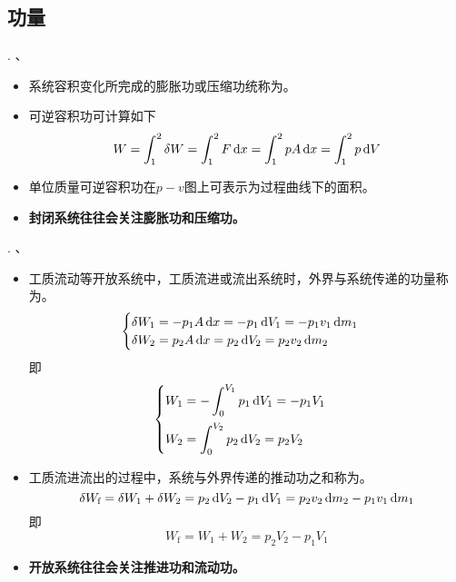 \subsection{功量}
. 、
	\begin{itemize}
		\item 系统容积变化所完成的膨胀功或压缩功统称为。
		\item 可逆容积功可计算如下
		\begin{equation}
			W= \int_{1}^{2} \delta W = \int_{1}^{2} F \, {\rm{d}} x = \int_{1}^{2} pA\,{\rm{d}} x =\int_{1}^{2} p\,{\rm{d}} V
		\end{equation}
	\item 单位质量可逆容积功在$p - v$图上可表示为过程曲线下的面积。
	\item \textbf{封闭系统往往会关注膨胀功和压缩功。}
	\end{itemize}
. 、
\begin{itemize}
	\item 工质流动等开放系统中，工质流进或流出系统时，外界与系统传递的功量称为。
	\begin{equation}
		\begin{cases}
			\delta W_1 = -p_1 A \,{\rm{d}} x = -p_1 \, {\rm{d}} V_1 = -p_1 v_1 \,{\rm{d}} m_1\\
			\delta W_2 = p_2 A \,{\rm{d}} x = p_2 \, {\rm{d}} V_2 = p_2 v_2 \,{\rm{d}} m_2
		\end{cases}
	\end{equation}
即
	\begin{equation}
		\begin{cases}
			\displaystyle W_1 = - \int_{0}^{V_1}p_1 \, {\rm{d}} V_1 = - p_1 V_1\\[1em]
			\displaystyle W_2 = \int_{0}^{V_2}p_2 \, {\rm{d}} V_2 = p_2 V_2\\
		\end{cases}
	\end{equation}
	\item 工质流进流出的过程中，系统与外界传递的推动功之和称为。
	\begin{equation}
		\delta W_{\text{f}}=\delta W_1+\delta W_2 =p_2 \,{\rm{d}} V_2 - p_1 \,{\rm{d}} V_1 = p_2 v_2 \,{\rm{d}} m_2 - p_1 v_1 \,{\rm{d}} m_1
	\end{equation}
	即
	\begin{equation}
		W_{\text{f}} = W_1 +W_2 = p_2V_2 -p_1V_1
	\end{equation}
	\item \textbf{开放系统往往会关注推进功和流动功。}
\end{itemize}

